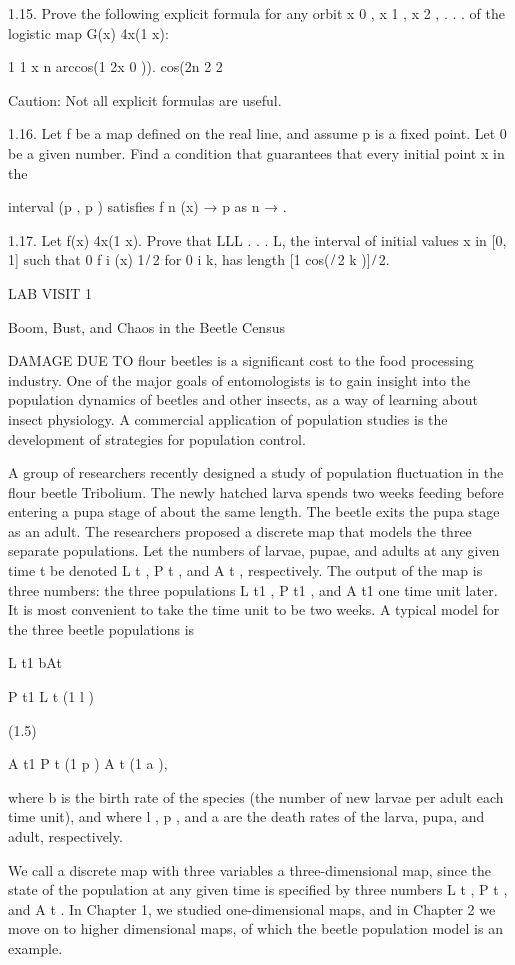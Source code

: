 {1.15. Prove the following explicit formula for any orbit x 0 , x 1 , x 2 , . . .  of the logistic map G(x)  
4x(1  x):

1 1 x n  arccos(1  2x 0 )).  cos(2n  2 2

Caution: Not all explicit formulas are useful.

1.16. Let f be a map deﬁned on the real line, and assume p is a ﬁxed point. Let   0 be a given number. 
Find a condition that guarantees that every initial point x in the

interval (p  , p   ) satisﬁes f n (x) → p as n → .

1.17. Let f(x)  4x(1  x). Prove that LLL . . . L, the interval of initial values x in [0, 1] such that 0  f 
i (x)  1 ̸ 2 for 0 i  k, has length [1  cos(  ̸ 2 k )] ̸ 2.

LAB VISIT 1

Boom, Bust, and Chaos in the Beetle Census

DAMAGE DUE TO ﬂour beetles is a signiﬁcant cost to the food processing industry. One of the major goals 
of entomologists is to gain insight into the population dynamics of beetles and other insects, as a way of 
learning about insect physiology. A commercial application of population studies is the development of 
strategies for population control.

A group of researchers recently designed a study of population ﬂuctuation in the ﬂour beetle Tribolium. 
The newly hatched larva spends two weeks feeding before entering a pupa stage of about the same length. The 
beetle exits the pupa stage as an adult. The researchers proposed a discrete map that models the three 
separate populations. Let the numbers of larvae, pupae, and adults at any given time t be denoted L t , P t 
, and A t , respectively. The output of the map is three numbers: the three populations L t1 , P t1 , and A 
t1 one time unit later. It is most convenient to take the time unit to be two weeks. A typical model for 
the three beetle populations is

L t1  bAt 

P t1  L t (1   l )

(1.5)

A t1  P t (1   p )  A t (1   a ),

where b is the birth rate of the species (the number of new larvae per adult each time unit), and where  l 
,  p , and  a are the death rates of the larva, pupa, and adult, respectively.

We call a discrete map with three variables a three-dimensional map, since the state of the population at 
any given time is speciﬁed by three numbers L t , P t , and A t . In Chapter 1, we studied one-dimensional 
maps, and in Chapter 2 we move on to higher dimensional maps, of which the beetle population model is an 
example.

}
